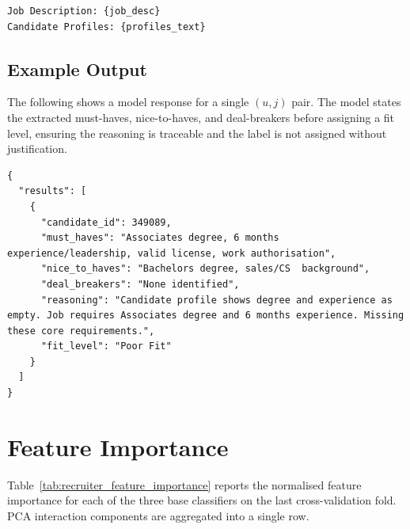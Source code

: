 \begin{appendices}
{\begin{verbatim}
Job Description: {job_desc}
Candidate Profiles: {profiles_text}
\end{verbatim}
}

\subsection*{Example Output}

The following shows a model response for a single
$(u,j)$ pair. The model states the extracted must-haves,
nice-to-haves, and deal-breakers before assigning a fit level,
ensuring the reasoning is traceable and the label is not assigned
without justification.

\begin{listing}[H]
\begin{verbatim}
{
  "results": [
    {
      "candidate_id": 349089,
      "must_haves": "Associates degree, 6 months experience/leadership, valid license, work authorisation",
      "nice_to_haves": "Bachelors degree, sales/CS  background",
      "deal_breakers": "None identified",
      "reasoning": "Candidate profile shows degree and experience as empty. Job requires Associates degree and 6 months experience. Missing these core requirements.",
      "fit_level": "Poor Fit"
    }
  ]
}
\end{verbatim}
\caption{Example LLM JSON output for a single $(u,j)$ pair evaluation.}
\label{lst:llm_json_output}
\end{listing}

\newpage

\section*{Feature Importance}
\label{app:exp_recruiter_feature_importance}

Table~\ref{tab:recruiter_feature_importance} reports the normalised feature 
importance for each of the three base classifiers on the last cross-validation 
fold. PCA interaction components are aggregated into a single row.


\end{appendices}
